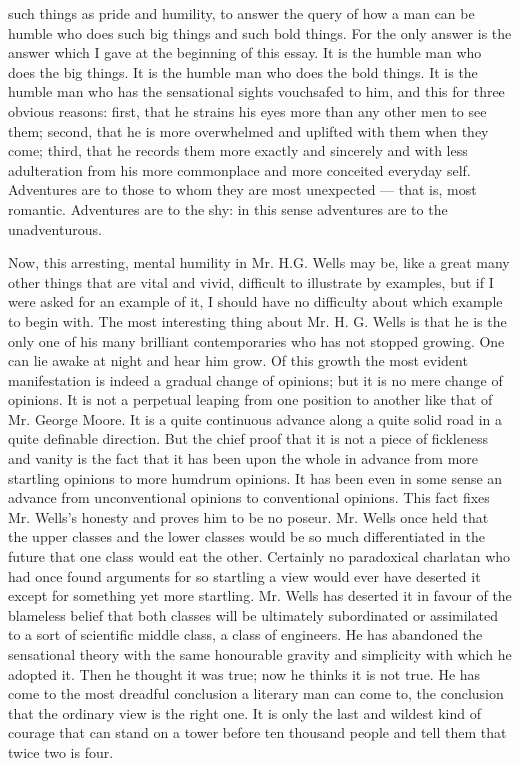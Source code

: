 such things as pride and humility, to answer the query of how a man can be humble who does such big things and such bold things. For the only answer is the answer which I gave at the beginning of this essay. It is the humble man who does the big things. It is the humble man who does the bold things. It is the humble man who has the sensational sights vouchsafed to him, and this for three obvious reasons: first, that he strains his eyes more than any other men to see them; second, that he is more overwhelmed and uplifted with them when they come; third, that he records them more exactly and sincerely and with less adulteration from his more commonplace and more conceited everyday self. Adventures are to those to whom they are most unexpected — that is, most romantic. Adventures are to the shy: in this sense adventures are to the unadventurous.

Now, this arresting, mental humility in Mr. H.G. Wells may be, like a great many other things that are vital and vivid, difficult to illustrate by examples, but if I were asked for an example of it, I should have no difficulty about which example to begin with. The most interesting thing about Mr. H. G. Wells is that he is the only one of his many brilliant contemporaries who has not stopped growing. One can lie awake at night and hear him grow. Of this growth the most evident manifestation is indeed a gradual change of opinions; but it is no mere change of opinions. It is not a perpetual leaping from one position to another like that of Mr. George Moore. It is a quite continuous advance along a quite solid road in a quite definable direction. But the chief proof that it is not a piece of fickleness and vanity is the fact that it has been upon the whole in advance from more startling opinions to more humdrum opinions. It has been even in some sense an advance from unconventional opinions to conventional opinions. This fact fixes Mr. Wells’s honesty and proves him to be no poseur. Mr. Wells once held that the upper classes and the lower classes would be so much differentiated in the future that one class would eat the other. Certainly no paradoxical charlatan who had once found arguments for so startling a view would ever have deserted it except for something yet more startling. Mr. Wells has deserted it in favour of the blameless belief that both classes will be ultimately subordinated or assimilated to a sort of scientific middle class, a class of engineers. He has abandoned the sensational theory with the same honourable gravity and simplicity with which he adopted it. Then he thought it was true; now he thinks it is not true. He has come to the most dreadful conclusion a literary man can come to, the conclusion that the ordinary view is the right one. It is only the last and wildest kind of courage that can stand on a tower before ten thousand people and tell them that twice two is four.

